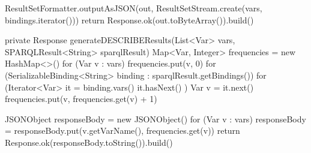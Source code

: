         ResultSetFormatter.outputAsJSON(out, ResultSetStream.create(vars, bindings.iterator()))
        return Response.ok(out.toByteArray()).build()
    


private Response generateDESCRIBEResults(List<Var> vars, SPARQLResult<String> sparqlResult) 
    Map<Var, Integer> frequencies = new HashMap<>()
    for (Var v : vars)
        frequencies.put(v, 0)
    for (SerializableBinding<String> binding : sparqlResult.getBindings()) 
        for (Iterator<Var> it = binding.vars() it.hasNext() ) 
            Var v = it.next()
            frequencies.put(v, frequencies.get(v) + 1)
        
    
    JSONObject responseBody = new JSONObject()
    for (Var v : vars)
        responseBody = responseBody.put(v.getVarName(), frequencies.get(v))
    return Response.ok(responseBody.toString()).build()
